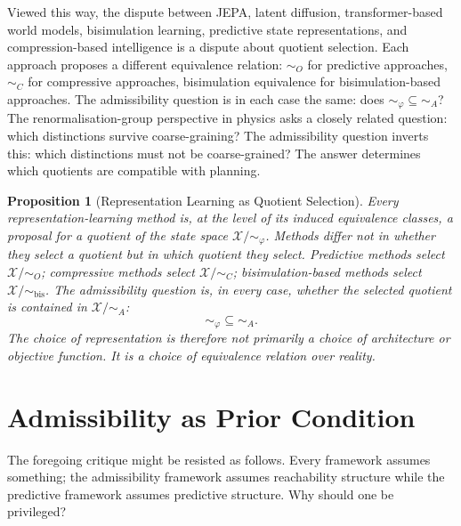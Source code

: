 \documentclass[11pt, a4paper]{article}
\theoremstyle{plain}
\newtheorem{proposition}{Proposition}
\theoremstyle{definition}
\theoremstyle{remark}
\newcommand{\simA}{\sim_A}
\newcommand{\simO}{\sim_O}
\newcommand{\simC}{\sim_C}
\begin{document}
Viewed this way, the dispute between JEPA, latent diffusion, transformer-based
world models, bisimulation learning, predictive state representations, and
compression-based intelligence is a dispute about quotient selection. Each
approach proposes a different equivalence relation: $\simO$ for predictive
approaches, $\simC$ for compressive approaches, bisimulation equivalence for
bisimulation-based approaches. The admissibility question is in each case the
same: does ${\sim_\varphi} \subseteq {\simA}$? The renormalisation-group
perspective in physics \citep{wilson1975renormalization} asks a closely related
question: which distinctions survive coarse-graining? The admissibility question
inverts this: which distinctions must not be coarse-grained? The answer
determines which quotients are compatible with planning.

\begin{proposition}[Representation Learning as Quotient Selection]
\label{prop:quotient}
Every representation-learning method is, at the level of its induced
equivalence classes, a proposal for a quotient of the state space
$\mathcal{X}/{\sim_\varphi}$. Methods differ not in whether they select a
quotient but in which quotient they select. Predictive methods select
$\mathcal{X}/{\simO}$; compressive methods select $\mathcal{X}/{\simC}$;
bisimulation-based methods select $\mathcal{X}/{\sim_{\text{bis}}}$. The
admissibility question is, in every case, whether the selected quotient is
contained in $\mathcal{X}/{\simA}$:
\begin{equation}
  {\sim_\varphi} \subseteq {\simA}.
\end{equation}
The choice of representation is therefore not primarily a choice of architecture
or objective function. It is a choice of equivalence relation over reality.
\end{proposition}

\section{Admissibility as Prior Condition}

The foregoing critique might be resisted as follows. Every framework assumes
something; the admissibility framework assumes reachability structure while the
predictive framework assumes predictive structure. Why should one be privileged?
\end{document}
